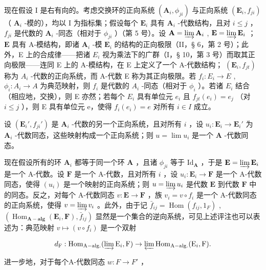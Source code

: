 现在假设 I 是右有向的。考虑交换环的正向系统 \((\mathbf{A}_i, \phi_{ji})\) 与正向系统 \((\mathbf{E}_i, f_{ji})\) （ \(\mathbf{A}_i\) -模的），均以 I 为指标集；假设每个 \(\mathbf{E}_i\) 具有 \(\mathbf{A}_i\) -代数结构，且对 \(i \leqslant j\) ， \(f_{ji}\) 是代数的 \(\mathbf{A}_i\) -同态（相对于 \(\phi_{ji}\) ）（第 5 号）。设 \(\mathbf{A} = \varinjlim \mathbf{A}_i\) , \(\mathbf{E} = \varinjlim \mathbf{E}_i\) ； \(\mathbf{E}\) 具有 A-模结构，即诸 \(\mathbf{A}_i\) -模 \(\mathbf{E}_i\) 的结构的正向极限（II，§ 6，第 2 号）；此外，E 上的合成律——把诸 \(E_{i}\) 视为乘法下的广群（I，§ 10，第 3 号）而取其正向极限——连同 E 上的 A-模结构，在 E 上定义了一个 A-代数结构； \((\mathbf{E}_{i}, f_{jt})\) 称为 \(A_{i}\) -代数的正向系统，而 A-代数 E 称为其正向极限。若 \(f_{i}: E_{i} \to E\) , \(\phi_{i}: A_{i} \to A\) 为典范映射，则 \(f_{i}\) 是代数的 \(A_{i}\) -同态（相对于 \(\phi_{i}\) ）。若诸 \(E_{i}\) 结合（相应地，交换），则 E 亦然；若每个 \(E_{i}\) 具有单位元 \(e_{i}\) 且 \(f_{jt}(e_{i}) = e_{j}\) （对 \(i \leqslant j\) ），则 E 具有单位元 e，使得 \(f_{i}(e_{i}) = e\) 对所有 \(i \in I\) 成立。

设 \((\mathbf{E}_i', f_{ji}')\) 是 \(\mathbf{A}_i\) -代数的另一个正向系统，且对所有 \(i\) ，设 \(u_i: \mathbf{E}_i \to \mathbf{E}_i'\) 为 \(\mathbf{A}_i\) -代数同态，这些映射构成一个正向系统；则 \(u = \lim u_i\) 是一个 \(\mathbf{A}\) -代数同态。

现在假设所有的环 \(\mathbf{A}_i\) 都等于同一个环 \(\mathbf{A}\) ，且诸 \(\phi_{ji}\) 等于 \(\mathrm{Id}_{\mathbf{A}}\) ，于是 \(\mathbf{E} = \varinjlim \mathbf{E}_i\) 是一个 A-代数。设 \(\mathbf{F}\) 是一个 A-代数，且对所有 \(i\) ，设 \(u_i: \mathbf{E}_i \to \mathbf{F}\) 是一个 A-代数同态，使得 \((u_i)\) 是一个映射的正向系统；则 \(u = \varinjlim u_i\) 是代数 \(\mathbf{E}\) 到代数 \(\mathbf{F}\) 中的同态。反之，对每个 A-代数同态 \(v: \mathbf{E} \to \mathbf{F}\) ，族 \(v_i = v \circ f_i\) 是一个 A-代数同态的正向系统，使得 \(v = \varinjlim v_i\) 。此外，由于记 \(\bar{f}_{ij} = \operatorname{Hom}(f_{ij}, 1_F)\) , \((\operatorname{Hom}_{\mathbf{A-alg}}(\mathbf{E}_i, \mathbf{F}), \bar{f}_{ij})\) 显然是一个集合的逆向系统，可见上述评注也可以表述为：典范映射 \(v \mapsto (v \circ f_i)\) 是一个双射

\[
d _ {\mathrm{F}}: \operatorname{Hom} _ {\mathrm{A-alg.}} (\varinjlim \mathrm{E} _ {i}, \mathrm{F}) \rightarrow \varprojlim \operatorname{Hom} _ {\mathrm{A-alg.}} (\mathrm{E} _ {i}, \mathrm{F}).
\]

进一步地，对于每个A-代数同态 \(w: F \rightarrow F'\) ，

